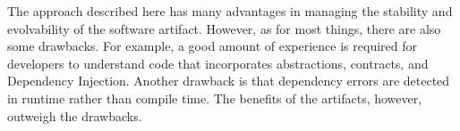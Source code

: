 The approach described here has many advantages in managing the stability and evolvability
of the software artifact. However, as for most things, there are also some drawbacks. For
example, a good amount of experience is required for developers to understand code that
incorporates abstractions, contracts, and Dependency Injection. Another drawback is that
dependency errors are detected in runtime rather than compile time. The benefits of the
artifacts, however, outweigh the drawbacks.